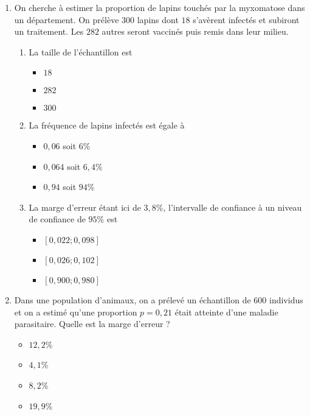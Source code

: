 \documentclass[11pt]{article}
\begin{document}
\begin{enumerate}
\begin{enumerate}
\begin{multicols}{3}
      \end{multicols}
  \end{enumerate}
\item On cherche à estimer la proportion de lapins touchés par la myxomatose
  dans un département. On prélève $300$ lapins dont $18$ s'avèrent infectés et
  subiront un traitement. Les $282$ autres seront vaccinés puis remis dans leur
  milieu.
  \begin{enumerate}
    \item La taille de l'échantillon est
      \begin{multicols}{3}
        \begin{itemize}[label=$\Box$]
          \item $18$
          \item $282$
          \item $300$
        \end{itemize}
      \end{multicols}
    \item  La fréquence de lapins infectés est égale à
      \begin{multicols}{3}
        \begin{itemize}[label=$\Box$]
          \item $0,06$ soit $6$\%
          \item $0,064$ soit $6,4$\%
          \item $0,94$ soit $94$\%
        \end{itemize}
      \end{multicols}
    \item La marge d'erreur étant ici de $3,8$\%, l'intervalle de confiance à un
      niveau de confiance de $95$\% est
      \begin{multicols}{3}
        \begin{itemize}[label=$\Box$]
          \item $\left[ 0,022 ; 0,098 \right]$
          \item $\left[ 0,026 ; 0,102 \right]$
          \item $\left[ 0,900 ; 0,980 \right]$
        \end{itemize}
      \end{multicols}
  \end{enumerate}
\item Dans une population d'animaux, on a prélevé un échantillon de $600$
  individus et on a estimé qu'une proportion $p=0,21$ était atteinte d'une
  maladie parasitaire. Quelle est la marge d'erreur ?
  \begin{multicols}{4}
    \begin{itemize}[label=$\Box$]
      \item $12,2$\%
      \item $4,1$\%
      \item $8,2$\%
      \item $19,9$\%
    \end{itemize}
  \end{multicols}
\end{enumerate}
\end{document}
